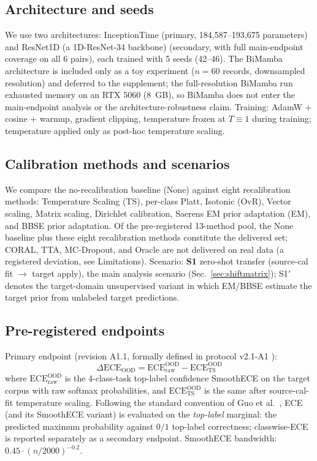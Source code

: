 \documentclass[final,5p,times,nonatbib]{elsarticle}
\begin{document}
\subsection{Architecture and seeds}
We use two architectures: InceptionTime (primary, 184{,}587--193{,}675
parameters) and ResNet1D (a 1D-ResNet-34 backbone) (secondary, with full
main-endpoint coverage on all 6 pairs), each trained with 5 seeds
(42--46). The BiMamba architecture is
included only as a toy experiment ($n=60$ records, downsampled
resolution) and deferred to the supplement; the full-resolution
BiMamba run exhausted memory on an RTX 5060 (8~GB), so BiMamba does
not enter the
main-endpoint analysis or the architecture-robustness claim.
Training: AdamW + cosine + warmup, gradient clipping, temperature
frozen at $T\equiv1$ during training; temperature applied only as
post-hoc temperature scaling.

\subsection{Calibration methods and scenarios}
We compare the no-recalibration baseline (None) against eight
recalibration methods: Temperature Scaling (TS), per-class Platt,
Isotonic (OvR), Vector scaling, Matrix scaling, Dirichlet calibration,
Saerens EM prior adaptation (EM), and BBSE prior adaptation.
Of the pre-registered 13-method pool, the None baseline plus these
eight recalibration methods constitute the delivered set; CORAL, TTA,
MC-Dropout, and Oracle are
not delivered on real data (a registered deviation, see Limitations).
Scenario: \textbf{S1} zero-shot transfer (source-cal fit
$\rightarrow$ target apply), the main analysis scenario
(Sec.~\ref{sec:shiftmatrix}); S1$'$ denotes the target-domain unsupervised
variant in which EM/BBSE estimate the target prior from unlabeled
target predictions.

\subsection{Pre-registered endpoints}
\label{sec:prereg}
Primary endpoint (revision A1.1, formally defined in
protocol v2.1-A1 \cite{protocolv21a1}):
\begin{equation}
    \Delta\text{ECE}_{\text{OOD}}
    = \text{ECE}_{\mathrm{raw}}^{\mathrm{OOD}} - \text{ECE}_{\mathrm{TS}}^{\mathrm{OOD}}
\end{equation}
where $\text{ECE}_{\mathrm{raw}}^{\mathrm{OOD}}$ is the 4-class-task top-label
confidence SmoothECE on
the target corpus with raw softmax probabilities, and
$\text{ECE}_{\mathrm{TS}}^{\mathrm{OOD}}$ is the same after source-cal-fit temperature
scaling. Following the standard convention of Guo et al.\
\cite{guo2017calibration}, ECE (and its SmoothECE variant) is evaluated on
the \emph{top-label} marginal: the predicted maximum probability against
$0/1$ top-label correctness; classwise-ECE is reported separately as a
secondary endpoint. SmoothECE bandwidth: $0.45\cdot(n/2000)^{-0.2}$.
\end{document}
